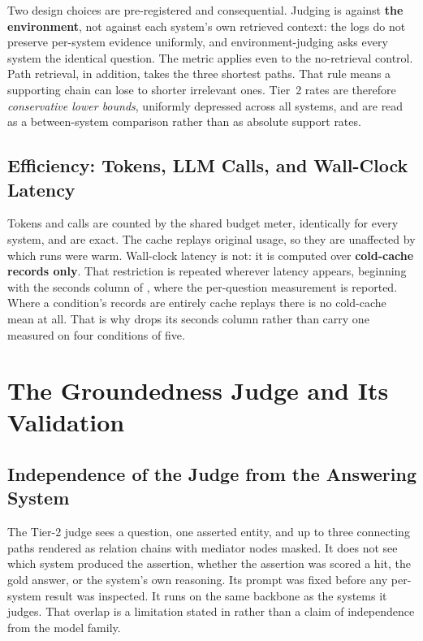 Two design choices are pre-registered and consequential. Judging is against
\textbf{the environment}, not against each system's own retrieved context: the
logs do not preserve per-system evidence uniformly, and environment-judging asks
every system the identical question. The metric applies even to the no-retrieval
control. Path retrieval, in addition, takes the three shortest paths. That rule
means a supporting chain can lose to shorter irrelevant ones. Tier~2 rates are
therefore \emph{conservative lower bounds}, uniformly depressed across all
systems, and are read as a between-system comparison rather than as absolute
support rates.

\subsection{Efficiency: Tokens, LLM Calls, and Wall-Clock Latency}

Tokens and calls are counted by the shared budget meter, identically for
every system, and are exact. The cache replays original usage,
so they are unaffected by which runs were warm. Wall-clock latency is not: it is
computed over \textbf{cold-cache records only}. That restriction is repeated
wherever latency appears, beginning with the seconds column of
, where the per-question measurement is reported. Where a
condition's records are entirely cache replays there is no cold-cache mean at
all. That is why  drops its seconds column rather than carry
one measured on four conditions of five.

\section{The Groundedness Judge and Its Validation}\label{sec:judge}

\subsection{Independence of the Judge from the Answering System}

The Tier-2 judge sees a question, one asserted entity, and up to three
connecting paths rendered as relation chains with mediator nodes masked. It does
not see which system produced the assertion, whether the assertion was scored a
hit, the gold answer, or the system's own reasoning. Its prompt was fixed before
any per-system result was inspected. It runs on the same backbone as the systems
it judges. That overlap is a limitation stated in  rather
than a claim of independence from the model family.

